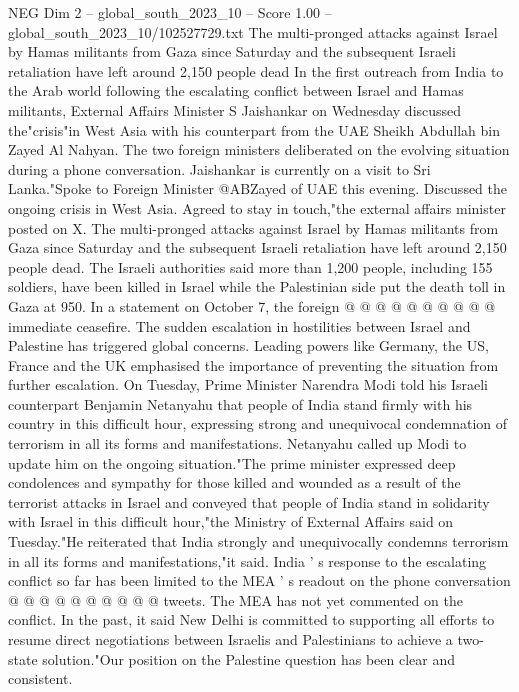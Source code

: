 \begin{textsample}{NEG Dim 2 – global\_south\_2023\_10 – Score 1.00 – global\_south\_2023\_10/102527729.txt}  \label{ex:f2_neg_273}
The multi-pronged attacks against Israel by Hamas militants from Gaza since Saturday and the subsequent Israeli retaliation have left around 2,150 people dead In the first outreach from India to the Arab world following the escalating conflict between Israel and Hamas militants, External Affairs Minister S Jaishankar on Wednesday discussed the"crisis"in West Asia with his counterpart from the UAE Sheikh Abdullah bin Zayed Al Nahyan.
The two foreign ministers deliberated on the evolving situation during a phone conversation.
Jaishankar is currently on a visit to Sri Lanka."Spoke to Foreign Minister @ABZayed of UAE this evening.
Discussed the ongoing crisis in West Asia.
Agreed to stay in touch,"the external affairs minister posted on X.
The multi-pronged attacks against Israel by Hamas militants from Gaza since Saturday and the subsequent Israeli retaliation have left around 2,150 people dead.
The Israeli authorities said more than 1,200 people, including 155 soldiers, have been killed in Israel while the Palestinian side put the death toll in Gaza at 950.
In a statement on October 7, the foreign @ @ @ @ @ @ @ @ @ @ immediate ceasefire.
The sudden escalation in hostilities between Israel and Palestine has triggered global concerns.
Leading powers like Germany, the US, France and the UK emphasised the importance of preventing the situation from further escalation.
On Tuesday, Prime Minister Narendra Modi told his Israeli counterpart Benjamin Netanyahu that people of India stand firmly with his country in this difficult hour, expressing strong and unequivocal condemnation of terrorism in all its forms and manifestations.
Netanyahu called up Modi to update him on the ongoing situation."The prime minister expressed deep condolences and sympathy for those killed and wounded as a result of the terrorist attacks in Israel and conveyed that people of India stand in solidarity with Israel in this difficult hour,"the Ministry of External Affairs said on Tuesday."He reiterated that India strongly and unequivocally condemns terrorism in all its forms and manifestations,"it said.
India ' s response to the escalating conflict so far has been limited to the MEA ' s readout on the phone conversation @ @ @ @ @ @ @ @ @ @ tweets.
The MEA has not yet commented on the conflict.
In the past, it said New Delhi is committed to supporting all efforts to resume direct negotiations between Israelis and Palestinians to achieve a two-state solution."Our position on the Palestine question has been clear and consistent.

\end{textsample}
